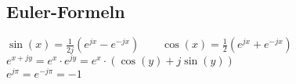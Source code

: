 \subsection{Euler-Formeln} 

	$\sin(x) = \frac{1}{2j} \left(e^{jx} - e^{-jx}\right) \qquad
	\cos(x) = \frac{1}{2} \left(e^{jx} + e^{-jx}\right)$ \\
	$e^{x+jy} = e^x \cdot e^{jy} = e^x \cdot \left(\cos(y) + j\sin(y)\right)$ \\
	$e^{j\pi} = e^{-j\pi} = -1$ \\